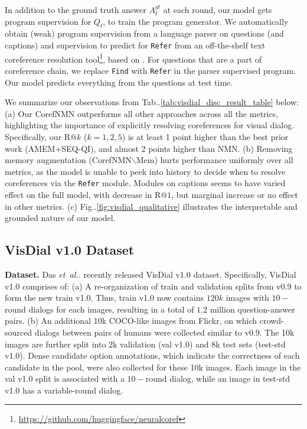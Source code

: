 \documentclass[runningheads]{llncs}
\makeatletter
\DeclareRobustCommand\onedot{\futurelet\@let@token\@onedot}
\def\@onedot{\ifx\@let@token.\else.\null\fi\xspace}
\def\etal{\textit{et~al\onedot}} \def\iid{i.i.d\onedot}
\def\Fig{Fig\onedot}
\def\Table{Tab\onedot}
\newcommand{\nmn}{CorefNMN\xspace}
\newcommand{\myparagraph}[1]{\vspace{0pt}\noindent{\bf #1}}
\makeatother
\begin{document}
\myparagraph{Supervision.}
In addition to the ground truth answer $A^{gt}_t$ at each round, our model 
gets program supervision for $Q_t$, to train the program generator.
We automatically obtain (weak) program supervision from a language parser on 
questions (and captions) \cite{hu16cvpr} and supervision to predict for \texttt{Refer} from an off-the-shelf text coreference resolution
tool\footnote{\url{https://github.com/huggingface/neuralcoref}}, based on
\cite{clark16emnlp}.
For questions that are a part of coreference chain, we replace \texttt{Find}
 with \texttt{Refer} in the parser supervised program. Our model predicts everything from the questions at test time. 

\myparagraph{Results.}
We summarize our observations from \Table\ref{tab:visdial_disc_result_table} below:
(a) Our \nmn outperforms all other approaches across all the metrics, 
	highlighting the importance of explicitly resolving coreferences for visual
	dialog.
  	Specifically, our R$@k$ ($k=1,2,5$) is at least 1 point higher than the 	
     best prior work (AMEM+SEQ-QI), and almost 2 points higher than NMN.
(b) Removing memory augmentation (\nmn{}$\backslash$Mem) hurts performance 
	uniformly over all metrics, as the model is unable to peek into 
    history to decide when to resolve coreferences via the \texttt{Refer} 
    module.
	Modules on captions seems to have varied effect on the full model, with
    decrease in R$@1$, but marginal increase or no effect in other metrics.
(c) \Fig\ref{fig:visdial_qualitative} illustrates the interpretable and 	
    grounded nature of our model.


\subsection{VisDial v1.0 Dataset}
\textbf{Dataset.}
Das \etal \cite{visdial} recently released VisDial v1.0 dataset.
Specifically, VisDial v1.0 comprises of:
(a) A re-organization of train and validation splits from v0.9 to form the new train v1.0.
Thus, train v1.0 now contains $120k$ images with $10-$round dialogs for each images, resulting
in a total of $1.2$ million question-answer pairs.
(b) An additional 10k COCO-like images from Flickr, on which crowd-sourced dialogs between
pairs of humans were collected similar to v0.9.
The 10k images are further split into 2k validation (val v1.0) and 8k test sets (test-std v1.0).
Dense candidate option annotations, which indicate the correctness 
of each candidate in the pool, were also collected for these 10k images.
Each image in the val v1.0 split is associated with a $10-$round dialog, 
while an image in test-std v1.0 has a variable-round dialog.
\end{document}
